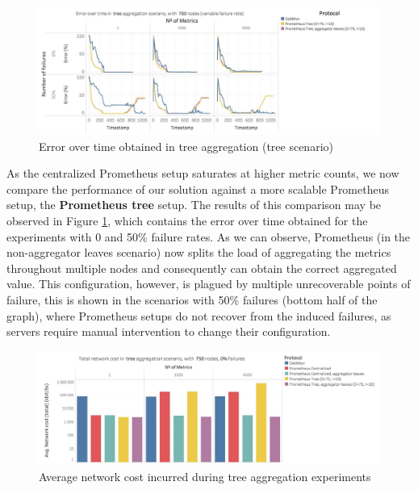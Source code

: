 \begin{figure}
    \centering
    \includegraphics[width=\linewidth]{Chapters/evaluation/figures/aggregation/Error_over_time_tree_tree.jpg}
    \caption{Error over time obtained in tree aggregation (tree scenario)}
    \label{fig:sec:mon_eval_tree_tree}
\end{figure}

As the centralized Prometheus setup saturates at higher metric counts, we now compare the performance of our solution against a more scalable Prometheus setup, the \textbf{Prometheus tree} setup. The results of this comparison may be observed in Figure \ref{fig:sec:mon_eval_tree_tree}, which contains the error over time obtained for the experiments with 0 and 50\% failure rates. As we can observe, Prometheus (in the non-aggregator leaves scenario) now splits the load of aggregating the metrics throughout multiple nodes and consequently can obtain the correct aggregated value. This configuration, however, is plagued by multiple unrecoverable points of failure, this is shown in the scenarios with 50\% failures (bottom half of the graph), where Prometheus setups do not recover from the induced failures, as servers require manual intervention to change their configuration.

\begin{figure}
    \centering
    \includegraphics[width=\linewidth]{Chapters/evaluation/figures/aggregation/network_cost_tree.jpg}
    \caption{Average network cost incurred during tree aggregation experiments}
    \label{fig:sec:mon_eval_tree_net_cost}
\end{figure}

